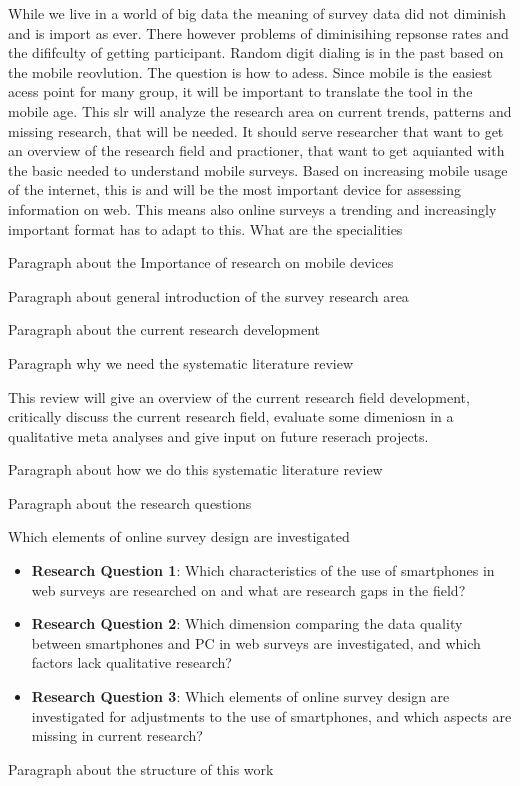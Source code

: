 While we live in a world of big data the meaning of survey data did not diminish and is import as ever. There however problems of diminisihing repsonse rates and the dififculty of getting participant. Random digit dialing is in the past based on the mobile reovlution. The question is how to adess. Since mobile is the easiest acess point for many group, it will be important to translate the tool in the mobile age. This slr will analyze the research area on current trends, patterns and missing research, that will be needed. It should serve researcher that want to get an overview of the research field and practioner, that want to get aquianted with the basic needed to understand mobile surveys. 
Based on increasing mobile usage of the internet, this is and will be the most important device for assessing information on web. This means also online surveys a trending and increasingly important format has to adapt to this. What are the specialities

Paragraph about the Importance of research on mobile devices

Paragraph about general introduction of the survey research area

Paragraph about the current research development

Paragraph why we need the systematic literature review

This review will give an overview of the current research field development, critically discuss the current research field, evaluate some dimeniosn in a qualitative meta analyses and give input on future reserach projects.

Paragraph about how we do this systematic literature review

Paragraph about the research questions


Which elements of online survey design are investigated 

\begin{itemize}
   \item \textbf{Research Question 1}: Which characteristics of the use of smartphones in web surveys are researched on and what are research gaps in the field? 
   \item \textbf{Research Question 2}: Which dimension comparing the data quality between smartphones and PC in web surveys are investigated, and which factors lack qualitative research?
   \item \textbf{Research Question 3}: Which elements of online survey design are investigated for adjustments to the use of smartphones, and which aspects are missing in current research?
\end{itemize}

Paragraph about the structure of this work


